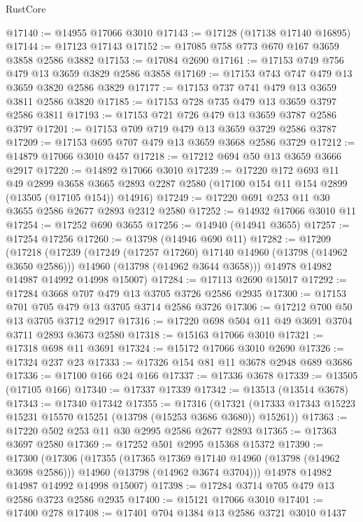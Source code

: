 \begin{lexlean}{RustCore}
\begin{coremodule}
@17140 := @14955 @17066 @3010
@17143 := @17128 (@17138 @17140 @16895)
@17144 := @17123 @17143
@17152 := @17085 @758 @773 @670 @167 @3659 @3858 @2586 @3882
@17153 := @17084 @2690
@17161 := @17153 @749 @756 @479 @13 @3659 @3829 @2586 @3858
@17169 := @17153 @743 @747 @479 @13 @3659 @3820 @2586 @3829
@17177 := @17153 @737 @741 @479 @13 @3659 @3811 @2586 @3820
@17185 := @17153 @728 @735 @479 @13 @3659 @3797 @2586 @3811
@17193 := @17153 @721 @726 @479 @13 @3659 @3787 @2586 @3797
@17201 := @17153 @709 @719 @479 @13 @3659 @3729 @2586 @3787
@17209 := @17153 @695 @707 @479 @13 @3659 @3668 @2586 @3729
@17212 := @14879 @17066 @3010 @457
@17218 := @17212 @694 @50 @13 @3659 @3666 @2917
@17220 := @14892 @17066 @3010
@17239 := @17220
    @172
    @693
    @11
    @49
    @2899
    @3658
    @3665
    @2893
    @2287
    @2580
    (@17100 @154 @11 @154 @2899 (@13505 (@17105 @154)) @14916)
@17249 := @17220 @691 @253 @11 @30 @3655 @2586 @2677 @2893 @2312 @2580
@17252 := @14932 @17066 @3010 @11
@17254 := @17252 @690 @3655
@17256 := @14940 (@14941 @3655)
@17257 := @17254 @17256
@17260 := @13798 (@14946 @690 @11)
@17282 := @17209
    (@17218
      (@17239
        (@17249 (@17257 @17260) @17140 @14960 (@13798 (@14962 @3650 @2586)))
        @14960
        (@13798 (@14962 @3644 @3658)))
      @14978
      @14982
      @14987
      @14992
      @14998
      @15007)
@17284 := @17113 @2690 @15017
@17292 := @17284 @3668 @707 @479 @13 @3705 @3726 @2586 @2935
@17300 := @17153 @701 @705 @479 @13 @3705 @3714 @2586 @3726
@17306 := @17212 @700 @50 @13 @3705 @3712 @2917
@17316 := @17220 @698 @504 @11 @49 @3691 @3704 @3711 @2893 @3673 @2580
@17318 := @15163 @17066 @3010
@17321 := @17318 @698 @11 @3691
@17324 := @15172 @17066 @3010 @2690
@17326 := @17324 @237 @23
@17333 := @17326 @154 @81 @11 @3678 @2948 @689 @3686
@17336 := @17100 @166 @24 @166
@17337 := @17336 @3678
@17339 := @13505 (@17105 @166)
@17340 := @17337 @17339
@17342 := @13513 (@13514 @3678)
@17343 := @17340 @17342
@17355 := @17316
    (@17321 (@17333 @17343 @15223 @15231 @15570 @15251 (@13798 (@15253 @3686 @3680)) @15261))
@17363 := @17220 @502 @253 @11 @30 @2995 @2586 @2677 @2893
@17365 := @17363 @3697 @2580
@17369 := @17252 @501 @2995 @15368 @15372
@17390 := @17300
    (@17306
      (@17355
        (@17365 @17369 @17140 @14960 (@13798 (@14962 @3698 @2586)))
        @14960
        (@13798 (@14962 @3674 @3704)))
      @14978
      @14982
      @14987
      @14992
      @14998
      @15007)
@17398 := @17284 @3714 @705 @479 @13 @2586 @3723 @2586 @2935
@17400 := @15121 @17066 @3010
@17401 := @17400 @278
@17408 := @17401 @704 @1384 @13 @2586 @3721 @3010 @1437

\end{coremodule}
\end{lexlean}
